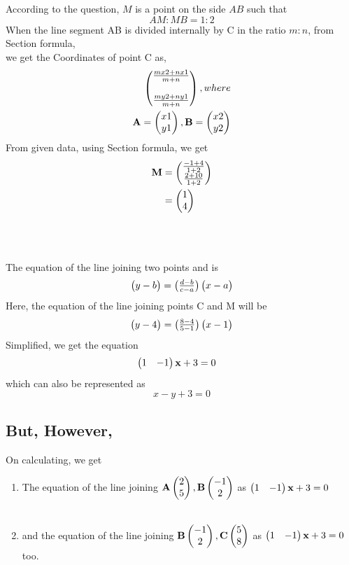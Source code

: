 \documentclass[journal,12pt,twocolumn]{IEEEtran}
\let\vec\mathbf                                %
\begin{document}
\solution According to the question, $M$ is a point on the side $AB$ such that $$AM : MB = 1 : 2$$
 When the line segment AB is divided internally by C in the ratio $m:n$, from Section formula,\\
 we get the Coordinates of point C as,
\begin{align*}
 \myvec{\frac{mx2+nx1}{m+n}\\\\ \frac{my2+ny1}{m+n}}, where\\
     \vec{A}=\myvec{x1\\y1}, \vec{B}=\myvec{x2\\y2}
\end{align*}
From given data, using Section formula, we get
\begin{align*}
    \vec{M} &= \myvec{\frac{-1+4}{1+2}\\ \frac{2+10}{1+2}}\\ 
    &= \myvec{1\\4}
\end{align*}\\\\\\
The equation of the line joining two points  and  is 
\begin{align*}
    \begin{pmatrix}y-b\end{pmatrix} = {\begin{pmatrix}\frac{d-b}{c-a}\end{pmatrix}}\begin{pmatrix}x-a\end{pmatrix}
\end{align*}
Here, the equation of the line joining points C and M will be
\begin{align*}
    \begin{pmatrix}y-4\end{pmatrix} = \begin{pmatrix}\frac{8-4}{5-1}\end{pmatrix}\begin{pmatrix}x-1\end{pmatrix} 
\end{align*}
Simplified, we get the equation
\begin{align*}
    \myvec{1 & - 1}\vec{x} + 3 &=0 
\end{align*}
 which can also be represented as $$x-y+3=0$$
\subsection*{But, However,} On calculating, we get\\
\begin{enumerate}
    \item The equation of the line joining $\vec{A}\myvec{2\\5}, \vec{B}\myvec{-1\\2}$ as $\myvec{1 & - 1}\vec{x} + 3 = 0$ \\\\
    
    \item and the equation of the line joining $\vec{B}\myvec{-1\\2}, \vec{C}\myvec{5\\8}$ as $\myvec{1 & - 1}\vec{x} + 3 = 0$ too.\\

\end{enumerate}
\end{document}
